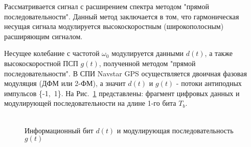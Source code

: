 %
%

Рассматривается сигнал с расширением спектра методом "прямой последовательности".
Данный метод заключается в том, что гармоническая несущая сигнала модулируется высокоскоростным (широкополосным)
расширяющим сигналом. 

Несущее колебание с частотой ${\omega_0}$  модулируется данными ${d(t)}$, а также высокоскоростной ПСП ${g(t)}$, полученной методом "прямой последовательности".
В СПИ Navstar GPS осуществляется двоичная фазовая модуляция (ДФМ или 2-ФМ), а значит ${d(t)}$  и ${g(t)}$  - потоки антиподных импульсов \mbox{\{-1, 1\}.}
На \mbox{Рис. \ref{pic:bit_and_code}} представлены: фрагмент цифровых данных и модулирующей последовательности на длине 1-го бита ${T_b}$.
\begin{figure}[h]
	\center{}
	\caption{\\Информационный бит ${d(t)}$ и модулирующая последовательность ${g(t)}$} 
	\label{pic:bit_and_code}
\end{figure}

